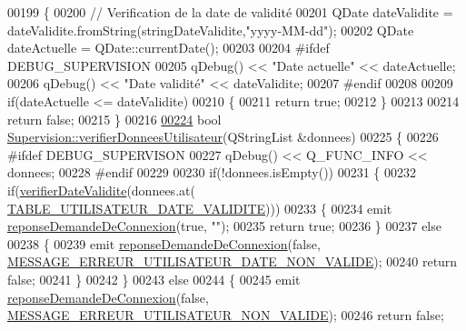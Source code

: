 \begin{DoxyCode}
{00199 \{
00200     \textcolor{comment}{// Verification de la date de validité}
00201     QDate dateValidite = dateValidite.fromString(stringDateValidite,\textcolor{stringliteral}{"yyyy-MM-dd"});
00202     QDate dateActuelle = QDate::currentDate();
00203 
00204 \textcolor{preprocessor}{    #ifdef DEBUG\_SUPERVISION}
00205         qDebug() << \textcolor{stringliteral}{"Date actuelle"} << dateActuelle;
00206         qDebug() << \textcolor{stringliteral}{"Date validité"} << dateValidite;
00207 \textcolor{preprocessor}{    #endif}
00208 
00209     \textcolor{keywordflow}{if}(dateActuelle <= dateValidite)
00210     \{
00211         \textcolor{keywordflow}{return} \textcolor{keyword}{true};
00212     \}
00213 
00214     \textcolor{keywordflow}{return} \textcolor{keyword}{false};
00215 \}
00216 
\hyperlink{class_supervision_ae3400dad53c52bc09198e8d7f80e0e67}{00224} \textcolor{keywordtype}{bool} \hyperlink{class_supervision_ae3400dad53c52bc09198e8d7f80e0e67}{Supervision::verifierDonneesUtilisateur}(QStringList &donnees)
00225 \{
00226 \textcolor{preprocessor}{    #ifdef DEBUG\_SUPERVISON}
00227         qDebug() << Q\_FUNC\_INFO << donnees;
00228 \textcolor{preprocessor}{    #endif}
00229 
00230     \textcolor{keywordflow}{if}(!donnees.isEmpty())
00231     \{
00232         \textcolor{keywordflow}{if}(\hyperlink{class_supervision_acc886b933823993f1e3873582e05e690}{verifierDateValidite}(donnees.at(
      \hyperlink{_utilisateur_8h_a2ee8bc4f44f3f2562a41638ec1d84ffca1a0604e4b99c353c04b8ee64a2524cca}{TABLE\_UTILISATEUR\_DATE\_VALIDITE})))
00233         \{
00234             emit \hyperlink{class_supervision_a116ed6de0e9e3c9c94886235e9f6d6e8}{reponseDemandeDeConnexion}(\textcolor{keyword}{true}, \textcolor{stringliteral}{""});
00235             \textcolor{keywordflow}{return} \textcolor{keyword}{true};
00236         \}
00237         \textcolor{keywordflow}{else}
00238         \{
00239             emit \hyperlink{class_supervision_a116ed6de0e9e3c9c94886235e9f6d6e8}{reponseDemandeDeConnexion}(\textcolor{keyword}{false}, 
      \hyperlink{_ihm_8h_a65a121daaef1677092ae2f6fa3392a10}{MESSAGE\_ERREUR\_UTILISATEUR\_DATE\_NON\_VALIDE});
00240             \textcolor{keywordflow}{return} \textcolor{keyword}{false};
00241         \}
00242     \}
00243     \textcolor{keywordflow}{else}
00244     \{
00245         emit \hyperlink{class_supervision_a116ed6de0e9e3c9c94886235e9f6d6e8}{reponseDemandeDeConnexion}(\textcolor{keyword}{false}, 
      \hyperlink{_ihm_8h_ac7f9ed2a1a76baab688e98e093b5d8fd}{MESSAGE\_ERREUR\_UTILISATEUR\_NON\_VALIDE});
00246         \textcolor{keywordflow}{return} \textcolor{keyword}{false};
}
\end{DoxyCode}
